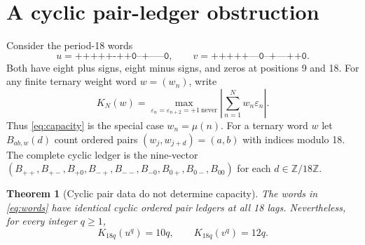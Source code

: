 \documentclass[11pt]{article}
\newtheorem{theorem}{Theorem}[section]
\newcommand{\Mob}{\mu}
\begin{document}
\section{A cyclic pair-ledger obstruction}

Consider the period-18 words
\begin{equation}
 u=\texttt{+++++-++0--+-----0},\qquad
 v=\texttt{+++++---0--+---++0}.
 \label{eq:words}
\end{equation}
Both have eight plus signs, eight minus signs, and zeros at positions 9 and
18.  For any finite ternary weight word $w=(w_n)$, write
\begin{equation}
 K_N(w)=\max_{\varepsilon_n=\varepsilon_{n+2}=+1\ \mathrm{never}}
 \left|\sum_{n=1}^{N}w_n\varepsilon_n\right|.
 \label{eq:generalcapacity}
\end{equation}
Thus \eqref{eq:capacity} is the special case $w_n=\Mob(n)$.  For a ternary
word $w$ let $B_{ab,w}(d)$ count ordered pairs
$(w_j,w_{j+d})=(a,b)$ with indices modulo 18.  The complete cyclic ledger is
the nine-vector $(B_{++},B_{+-},B_{+0},B_{-+},B_{--},B_{-0},B_{0+},B_{0-},B_{00})$
for each $d\in\mathbb Z/18\mathbb Z$.

\begin{theorem}[Cyclic pair data do not determine capacity]
The words in \eqref{eq:words} have identical cyclic ordered pair ledgers at
all 18 lags.  Nevertheless, for every integer $q\geq1$,
\begin{equation}
 K_{18q}(u^q)=10q,\qquad K_{18q}(v^q)=12q.
 \label{eq:periodcapacity}
\end{equation}
\end{theorem}
\end{document}
